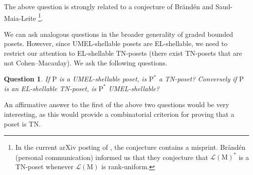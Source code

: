 \documentclass[11pt,a4paper]{amsart}
\theoremstyle{results}
\theoremstyle{definitions}
\newtheorem{question}[thm]{Question}
\def\P{\mathbb{P}}
\newcommand{\M}{\mathrm{M}}
\newcommand{\Pdual}{\P^{\ast}}
\renewcommand{\P}{\mathrm{P}}
\begin{document}
The above question is strongly related to a conjecture of Br\"and\'en and Saud-Maia-Leite \cite[Conjecture~4.3]{branden-saud1}\footnote{In the current arXiv posting of \cite{branden-saud1}, the conjecture contains a misprint. Br\"and\'en (personal communication) informed us that they conjecture that $\mathcal{L}(\M)^*$ is a TN-poset whenever $\mathcal{L}(\M)$ is rank-uniform.}. 
\smallskip

We can ask analogous questions in the broader generality of graded bounded posets. However, since UMEL-shellable posets are EL-shellable, we need to restrict our attention to EL-shellable TN-posets (there exist TN-posets that are not Cohen--Macaulay). We ask the following questions. 

\begin{question}
    If $\P$ is a UMEL-shellable poset, is $\Pdual$ a TN-poset? Conversely if $\P$ is an EL-shellable TN-poset, is $\Pdual$ UMEL-shellable?  
\end{question}

An affirmative answer to the first of the above two questions would be very interesting, as this would provide a combinatorial criterion for proving that a poset is TN.



\end{document}
